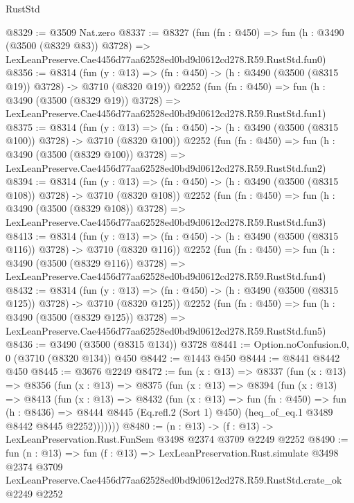 \begin{lexlean}{RustStd}
\begin{coremodule}
@8329 := @3509 Nat.zero
@8337 := @8327
    (fun (fn : @450) =>
    fun (h : @3490 (@3500 (@8329 @83)) @3728) =>
    LexLeanPreserve.Cae4456d77aa62528ed0bd9d0612cd278.R59.RustStd.fun0)
@8356 := @8314
    (fun (y : @13) => (fn : @450) -> (h : @3490 (@3500 (@8315 @19)) @3728) -> @3710 (@8320 @19))
    @2252
    (fun (fn : @450) =>
    fun (h : @3490 (@3500 (@8329 @19)) @3728) =>
    LexLeanPreserve.Cae4456d77aa62528ed0bd9d0612cd278.R59.RustStd.fun1)
@8375 := @8314
    (fun (y : @13) => (fn : @450) -> (h : @3490 (@3500 (@8315 @100)) @3728) -> @3710 (@8320 @100))
    @2252
    (fun (fn : @450) =>
    fun (h : @3490 (@3500 (@8329 @100)) @3728) =>
    LexLeanPreserve.Cae4456d77aa62528ed0bd9d0612cd278.R59.RustStd.fun2)
@8394 := @8314
    (fun (y : @13) => (fn : @450) -> (h : @3490 (@3500 (@8315 @108)) @3728) -> @3710 (@8320 @108))
    @2252
    (fun (fn : @450) =>
    fun (h : @3490 (@3500 (@8329 @108)) @3728) =>
    LexLeanPreserve.Cae4456d77aa62528ed0bd9d0612cd278.R59.RustStd.fun3)
@8413 := @8314
    (fun (y : @13) => (fn : @450) -> (h : @3490 (@3500 (@8315 @116)) @3728) -> @3710 (@8320 @116))
    @2252
    (fun (fn : @450) =>
    fun (h : @3490 (@3500 (@8329 @116)) @3728) =>
    LexLeanPreserve.Cae4456d77aa62528ed0bd9d0612cd278.R59.RustStd.fun4)
@8432 := @8314
    (fun (y : @13) => (fn : @450) -> (h : @3490 (@3500 (@8315 @125)) @3728) -> @3710 (@8320 @125))
    @2252
    (fun (fn : @450) =>
    fun (h : @3490 (@3500 (@8329 @125)) @3728) =>
    LexLeanPreserve.Cae4456d77aa62528ed0bd9d0612cd278.R59.RustStd.fun5)
@8436 := @3490 (@3500 (@8315 @134)) @3728
@8441 := Option.noConfusion.{0, 0} (@3710 (@8320 @134)) @450
@8442 := @1443 @450
@8444 := @8441 @8442 @450
@8445 := @3676 @2249
@8472 := fun (x : @13) =>
  @8337
    (fun (x : @13) =>
    @8356
      (fun (x : @13) =>
      @8375
        (fun (x : @13) =>
        @8394
          (fun (x : @13) =>
          @8413
            (fun (x : @13) =>
            @8432
              (fun (x : @13) =>
              fun (fn : @450) =>
              fun (h : @8436) =>
              @8444 @8445 (Eq.refl.{2} (Sort 1) @450) (heq_of_eq.{1} @3489 @8442 @8445 @2252)))))))
@8480 := (n : @13) -> (f : @13) -> LexLeanPreservation.Rust.FunSem @3498 @2374 @3709 @2249 @2252
@8490 := fun (n : @13) =>
  fun (f : @13) =>
  LexLeanPreservation.Rust.simulate
    @3498
    @2374
    @3709
    LexLeanPreserve.Cae4456d77aa62528ed0bd9d0612cd278.R59.RustStd.crate_ok
    @2249
    @2252
\end{coremodule}
\end{lexlean}
